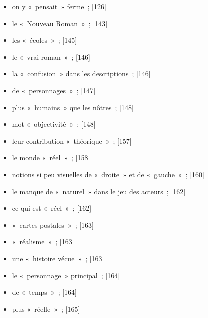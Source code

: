 \documentclass[12pt, a4paper]{article}
\begin{document}
\begin{itemize}
    \item on y «~pensait~» ferme{\color{gray}~; [126]}

    \item le «~Nouveau Roman~»{\color{gray}~; [143]}

    \item les «~écoles~»{\color{gray}~; [145]}

    \item le «~vrai roman~»{\color{gray}~; [146]}

    \item la «~confusion~» dans les descriptions{\color{gray}~; [146]}

    \item de «~personnages~»{\color{gray}~; [147]}

    \item plus «~humains~» que les nôtres{\color{gray}~; [148]}

    \item mot «~objectivité~»{\color{gray}~; [148]}

    \item leur contribution «~théorique~»{\color{gray}~; [157]}

    \item le monde «~réel~»{\color{gray}~; [158]}

    \item notions si peu visuelles de «~droite~» et de «~gauche~»{\color{gray}~; [160]}

    \item le manque de «~naturel~» dans le jeu des acteurs{\color{gray}~; [162]}

    \item ce qui est «~réel~»{\color{gray}~; [162]}

    \item «~cartes-postales~»{\color{gray}~; [163]}

    \item «~réalisme~»{\color{gray}~; [163]}

    \item une «~histoire vécue~»{\color{gray}~; [163]}

    \item le «~personnage~» principal{\color{gray}~; [164]}

    \item de «~temps~»{\color{gray}~; [164]}

    \item plus «~réelle~»{\color{gray}~; [165]}


\end{itemize}
\end{document}
